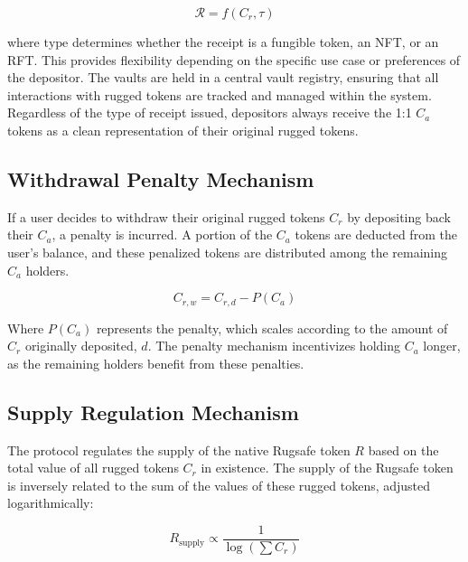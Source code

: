 \documentclass{article}
\begin{document}
\[
\mathcal{R} = f(C_r, \tau)
\]

where $\text{type}$ determines whether the receipt is a fungible token, an NFT, or an RFT. This provides flexibility depending on the specific use case or preferences of the depositor. The vaults are held in a central vault registry, ensuring that all interactions with rugged tokens are tracked and managed within the system. Regardless of the type of receipt issued, depositors always receive the 1:1 $C_a$ tokens as a clean representation of their original rugged tokens.








\subsection{Withdrawal Penalty Mechanism}
If a user decides to withdraw their original rugged tokens $C_r$ by depositing back their $C_a$, a penalty is incurred. A portion of the $C_a$ tokens are deducted from the user's balance, and these penalized tokens are distributed among the remaining $C_a$ holders.

\begin{equation}
C_{r,w} = C_{r,d} - P(C_a)
\end{equation}

Where $P(C_a)$ represents the penalty, which scales according to the amount of $C_r$ originally deposited, \(d\). The penalty mechanism incentivizes holding $C_a$ longer, as the remaining holders benefit from these penalties.
















\subsection{Supply Regulation Mechanism}
The protocol regulates the supply of the native Rugsafe token $R$ based on the total value of all rugged tokens $C_r$ in existence. The supply of the Rugsafe token is inversely related to the sum of the values of these rugged tokens, adjusted logarithmically:

\begin{equation}
R_\text{supply}  \propto \frac{1}{\log\left(\sum C_r\right)}
\end{equation}
\end{document}
